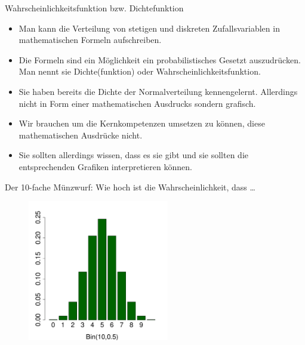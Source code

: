 \documentclass[usenames,dvipsnames,handout]{beamer}
\newcommand{\oldtextdied}{{\fontfamily{cmr}\selectfont\textdied}}
\newcommand{\oldtextborn}{{\fontfamily{cmr}\selectfont\textborn}}
\begin{document}
\begin{frame}{Wahrscheinlichkeitsfunktion bzw. Dichtefunktion}
\begin{itemize}
\item{Man kann die Verteilung von stetigen und diskreten Zufallsvariablen in mathematischen Formeln
aufschreiben. }\pause
\item{Die Formeln sind ein Möglichkeit ein probabilistisches Gesetzt auszudrücken. Man nennt sie Dichte(funktion)
oder Wahrscheinlichkeitsfunktion.}\pause
\item{Sie haben bereits die Dichte der Normalverteilung kennengelernt. Allerdings nicht in Form
einer mathematischen Ausdrucks sondern grafisch.}\pause
\item{Wir brauchen um die Kernkompetenzen umsetzen zu können, diese mathematischen Ausdrücke nicht.}\pause
\item{Sie sollten allerdings wissen, dass es sie gibt und sie sollten die entsprechenden Grafiken interpretieren können.}
\end{itemize}
\end{frame}

\begin{frame}{Der 10-fache Münzwurf: Wie hoch ist die Wahrscheinlichkeit, dass \dots}
  \begin{figure}[ht]
 	\centering
 	      \includegraphics[width=0.55\textwidth]{muenze.pdf}
 	\end{figure}
\end{frame}
\end{document}
